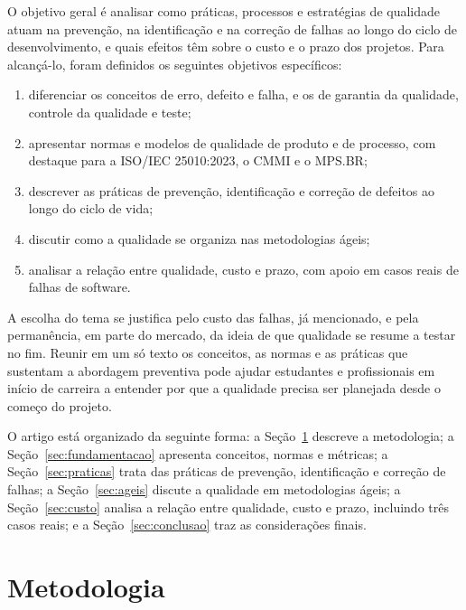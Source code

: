 \documentclass[12pt,a4paper]{article}
\begin{document}
O objetivo geral é analisar como práticas, processos e estratégias de qualidade atuam na prevenção, na identificação e na correção de falhas ao longo do ciclo de desenvolvimento, e quais efeitos têm sobre o custo e o prazo dos projetos. Para alcançá-lo, foram definidos os seguintes objetivos específicos:

\begin{enumerate}
\item diferenciar os conceitos de erro, defeito e falha, e os de garantia da qualidade, controle da qualidade e teste;
\item apresentar normas e modelos de qualidade de produto e de processo, com destaque para a ISO/IEC 25010:2023, o CMMI e o MPS.BR;
\item descrever as práticas de prevenção, identificação e correção de defeitos ao longo do ciclo de vida;
\item discutir como a qualidade se organiza nas metodologias ágeis;
\item analisar a relação entre qualidade, custo e prazo, com apoio em casos reais de falhas de software.
\end{enumerate}

A escolha do tema se justifica pelo custo das falhas, já mencionado, e pela permanência, em parte do mercado, da ideia de que qualidade se resume a testar no fim. Reunir em um só texto os conceitos, as normas e as práticas que sustentam a abordagem preventiva pode ajudar estudantes e profissionais em início de carreira a entender por que a qualidade precisa ser planejada desde o começo do projeto.

O artigo está organizado da seguinte forma: a Seção~\ref{sec:metodologia} descreve a metodologia; a Seção~\ref{sec:fundamentacao} apresenta conceitos, normas e métricas; a Seção~\ref{sec:praticas} trata das práticas de prevenção, identificação e correção de falhas; a Seção~\ref{sec:ageis} discute a qualidade em metodologias ágeis; a Seção~\ref{sec:custo} analisa a relação entre qualidade, custo e prazo, incluindo três casos reais; e a Seção~\ref{sec:conclusao} traz as considerações finais.

\section{Metodologia}
\label{sec:metodologia}
\end{document}
